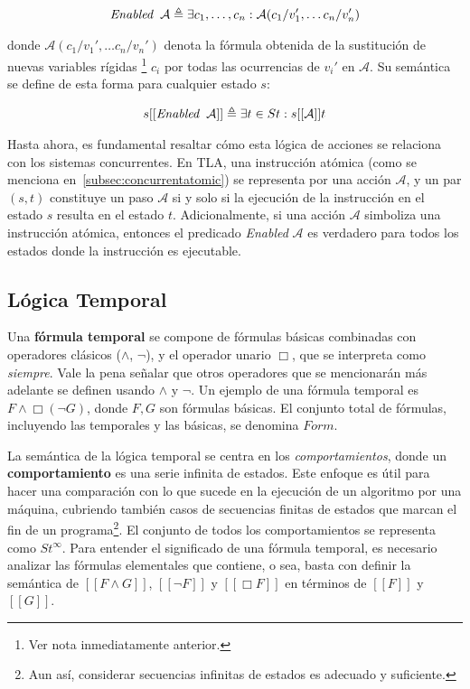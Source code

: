 \begin{align}
\textit{Enabled} \hspace{0.2cm} \mathcal{A} \triangleq \exists c_1,\ldots,c_n : \mathcal{A}(c_1 / v_1', \ldots c_n / v_n')
\end{align}

donde $\mathcal{A}(c_1 / v_1', \ldots c_n / v_n')$ denota la fórmula obtenida de la sustitución de nuevas variables rígidas \footnote{Ver nota inmediatamente anterior.} $c_i$ por todas las ocurrencias de $v_i'$ en $\mathcal{A}$. Su semántica se define de esta forma para cualquier estado $s$:

\begin{align}
s[[\textit{Enabled} \hspace{0.2cm} \mathcal{A}]] \triangleq \exists t \in St : s[[\mathcal{A}]]t
\end{align}

Hasta ahora, es fundamental resaltar cómo esta lógica de acciones se relaciona con los sistemas concurrentes. En TLA, una instrucción atómica (como se menciona en~\ref{subsec:concurrentatomic}) se representa por una acción $\mathcal{A}$, y un par $(s,t)$ constituye un paso $\mathcal{A}$ si y solo si la ejecución de la instrucción en el estado $s$ resulta en el estado $t$. Adicionalmente, si una acción $\mathcal{A}$ simboliza una instrucción atómica, entonces el predicado \textit{Enabled} $\mathcal{A}$ es verdadero para todos los estados donde la instrucción es ejecutable.

\subsection{Lógica Temporal}\label{subsection:LTemporal}
Una \textbf{fórmula temporal} se compone de fórmulas básicas combinadas con operadores clásicos ($\land$, $\neg$), y el operador unario $\Box$, que se interpreta como \textit{siempre}. Vale la pena señalar que otros operadores que se mencionarán más adelante se definen usando $\land$ y $\neg$. Un ejemplo de una fórmula temporal es $F \land \Box(\neg G)$, donde $F,G$ son fórmulas básicas. El conjunto total de fórmulas, incluyendo las temporales y las básicas, se denomina $Form$.

La semántica de la lógica temporal se centra en los \textit{comportamientos}, donde un \textbf{comportamiento} es una serie infinita de estados. Este enfoque es útil para hacer una comparación con lo que sucede en la ejecución de un algoritmo por una máquina, cubriendo también casos de secuencias finitas de estados que marcan el fin de un programa\footnote{Aun así, considerar secuencias infinitas de estados es adecuado y suficiente.}. El conjunto de todos los comportamientos se representa como $St^\infty$. Para entender el significado de una fórmula temporal, es necesario analizar las fórmulas elementales que contiene, o sea, basta con definir la semántica de $[[F \land G]]$, $[[\neg F]]$ y $[[\Box F]]$ en términos de $[[F]]$ y $[[G]]$.

